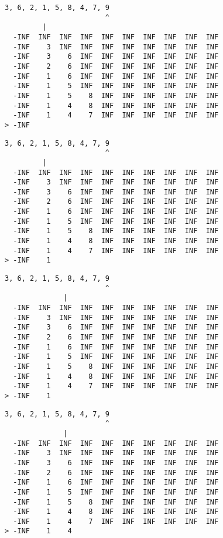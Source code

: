 { \begin{verbatim}
3, 6, 2, 1, 5, 8, 4, 7, 9
                        ^
         |
  -INF  INF  INF  INF  INF  INF  INF  INF  INF  INF
  -INF    3  INF  INF  INF  INF  INF  INF  INF  INF
  -INF    3    6  INF  INF  INF  INF  INF  INF  INF
  -INF    2    6  INF  INF  INF  INF  INF  INF  INF
  -INF    1    6  INF  INF  INF  INF  INF  INF  INF
  -INF    1    5  INF  INF  INF  INF  INF  INF  INF
  -INF    1    5    8  INF  INF  INF  INF  INF  INF
  -INF    1    4    8  INF  INF  INF  INF  INF  INF
  -INF    1    4    7  INF  INF  INF  INF  INF  INF
> -INF                                             
\end{verbatim} }

{ \begin{verbatim}
3, 6, 2, 1, 5, 8, 4, 7, 9
                        ^
         |
  -INF  INF  INF  INF  INF  INF  INF  INF  INF  INF
  -INF    3  INF  INF  INF  INF  INF  INF  INF  INF
  -INF    3    6  INF  INF  INF  INF  INF  INF  INF
  -INF    2    6  INF  INF  INF  INF  INF  INF  INF
  -INF    1    6  INF  INF  INF  INF  INF  INF  INF
  -INF    1    5  INF  INF  INF  INF  INF  INF  INF
  -INF    1    5    8  INF  INF  INF  INF  INF  INF
  -INF    1    4    8  INF  INF  INF  INF  INF  INF
  -INF    1    4    7  INF  INF  INF  INF  INF  INF
> -INF    1                                        
\end{verbatim} }

{ \begin{verbatim}
3, 6, 2, 1, 5, 8, 4, 7, 9
                        ^
              |
  -INF  INF  INF  INF  INF  INF  INF  INF  INF  INF
  -INF    3  INF  INF  INF  INF  INF  INF  INF  INF
  -INF    3    6  INF  INF  INF  INF  INF  INF  INF
  -INF    2    6  INF  INF  INF  INF  INF  INF  INF
  -INF    1    6  INF  INF  INF  INF  INF  INF  INF
  -INF    1    5  INF  INF  INF  INF  INF  INF  INF
  -INF    1    5    8  INF  INF  INF  INF  INF  INF
  -INF    1    4    8  INF  INF  INF  INF  INF  INF
  -INF    1    4    7  INF  INF  INF  INF  INF  INF
> -INF    1                                        
\end{verbatim} }

{ \begin{verbatim}
3, 6, 2, 1, 5, 8, 4, 7, 9
                        ^
              |
  -INF  INF  INF  INF  INF  INF  INF  INF  INF  INF
  -INF    3  INF  INF  INF  INF  INF  INF  INF  INF
  -INF    3    6  INF  INF  INF  INF  INF  INF  INF
  -INF    2    6  INF  INF  INF  INF  INF  INF  INF
  -INF    1    6  INF  INF  INF  INF  INF  INF  INF
  -INF    1    5  INF  INF  INF  INF  INF  INF  INF
  -INF    1    5    8  INF  INF  INF  INF  INF  INF
  -INF    1    4    8  INF  INF  INF  INF  INF  INF
  -INF    1    4    7  INF  INF  INF  INF  INF  INF
> -INF    1    4                                   
\end{verbatim} }

